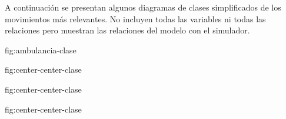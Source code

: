 
A continuación se presentan algunos diagramas de clases simplificados de los
movimientos más relevantes. No incluyen todas las variables ni todas las
relaciones pero muestran las relaciones del modelo con el simulador.

{}{fig:ambulancia-clase}


{}{fig:center-center-clase}


{}{fig:center-center-clase}


{}{fig:center-center-clase}

